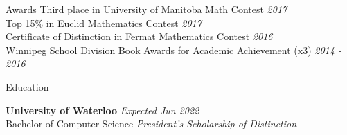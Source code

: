 \documentclass{resume} %
\newcommand{\award}[2]{#1 \hfill {\em #2}}
\begin{document}
\begin{rSection}{Awards}
    \award{Third place in University of Manitoba Math Contest}{2017} \\
    \award{Top 15\% in Euclid Mathematics Contest}{2017} \\
    \award{Certificate of Distinction in Fermat Mathematics Contest}{2016} \\
    \award{Winnipeg School Division Book Awards for Academic Achievement (x3)}{2014 - 2016}
\end{rSection}


\begin{rSection}{Education}

    {\bf University of Waterloo} \hfill {\em Expected Jun 2022} \\
    Bachelor of Computer Science \hfill {\em President's Scholarship of Distinction}
    
\end{rSection}
    
    
\end{document}
